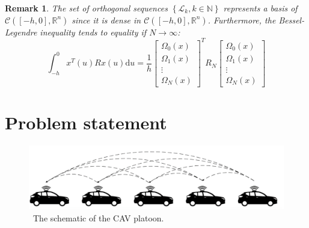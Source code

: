 \documentclass[a4paper]{cas-sc}
\newtheorem{remark}[theorem]{Remark}
\begin{document}
\begin{remark}
  The set of orthogonal sequences $\left\{ {{\mathcal{L}_k},k \in \mathbb{N}} \right\}$ represents a basis of $\mathcal{C}\left( {\left[ { - h,0} \right],{\mathbb{R}^n}} \right)$ since it is dense in $\mathcal{C}\left( {\left[ { - h,0} \right],{\mathbb{R}^n}} \right)$. Furthermore, the Bessel-Legendre inequality tends to equality if $N \to \infty $:
  \begin{equation}
    \int_{ - h}^0 {{x^T}} (u)Rx(u){\text{d}}u = \frac{1}{h}{\left[ {\begin{array}{*{20}{c}}
              {{\Omega _0}(x)} \\
              {{\Omega _1}(x)} \\
              \vdots           \\
              {{\Omega _N}(x)}
            \end{array}} \right]^T}{R_N}\left[ {\begin{array}{*{20}{c}}
            {{\Omega _0}(x)} \\
            {{\Omega _1}(x)} \\
            \vdots           \\
            {{\Omega _N}(x)}
          \end{array}} \right]
  \end{equation}
\end{remark}




\section{Problem statement}
\label{Section 3}

\begin{figure}
  \centering
  \includegraphics[width=14cm]{figs/fig1.png}
  \caption{~The schematic of the CAV platoon.}
  \label{fig1}
\end{figure}
\end{document}
